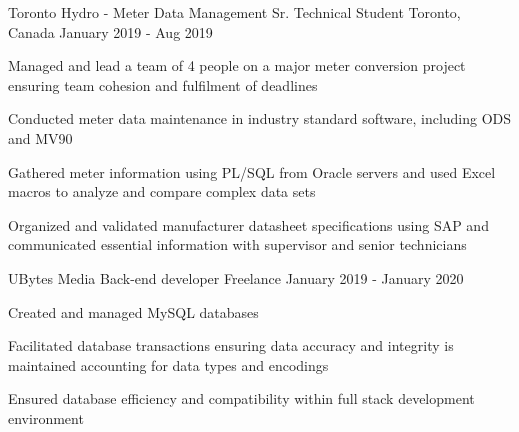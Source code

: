 


\begin{cventries}



\cventry
{Toronto Hydro - Meter Data Management} %
{Sr. Technical Student} %
{Toronto, Canada} %
{January 2019 - Aug 2019} %
{ %
\begin{cvitems}
\item {Managed and lead a team of 4 people on a major meter conversion project ensuring team cohesion and fulfilment of deadlines}
\item {Conducted meter data maintenance in industry standard software, including ODS and MV90}
\item {Gathered meter information using PL/SQL from Oracle servers and used Excel macros to analyze and compare complex data sets}
\item {Organized and validated manufacturer datasheet specifications using SAP and communicated essential information with supervisor and senior technicians}
\end{cvitems}
}


\cventry
{UBytes Media} %
{Back-end developer} %
{Freelance} %
{January 2019 - January 2020} %
{ %
\begin{cvitems}
\item {Created and managed MySQL databases}
\item {Facilitated database transactions ensuring data accuracy and integrity is maintained accounting for data types and encodings}
\item {Ensured database efficiency and compatibility within full stack development environment}
\end{cvitems}
}




\end{cventries}